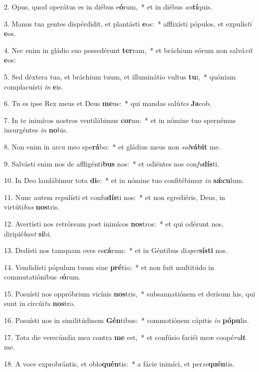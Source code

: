 2. Opus, quod operátus es in diébus e\textbf{ó}rum,~*  et in diébus \textit{an}\textbf{tí}quis.\

3. Manus tua gentes dispérdidit, et plantásti \textbf{e}os:~*  afflixísti pópulos, et expulís\textit{ti} \textbf{e}os.\

4. Nec enim in gládio suo possedérunt \textbf{ter}ram,~*  et bráchium eórum non salvá\textit{vit} \textbf{e}os:\

5. Sed déxtera tua, et bráchium tuum, et illuminátio vultus \textbf{tu}i,~*  quóniam complacuísti \textit{in} \textbf{e}is.\

6. Tu es ipse Rex meus et Deus \textbf{me}us:~*  qui mandas salú\textit{tes} \textbf{Ja}cob.\

7. In te inimícos nostros ventilábimus \textbf{cor}nu:~*  et in nómine tuo spernémus insurgéntes \textit{in} \textbf{no}bis.\

8. Non enim in arcu meo spe\textbf{rá}bo:~*  et gládius meus non \textit{sal}\textbf{vá}\textbf{bit} me.\

9. Salvásti enim nos de affligénti\textbf{bus} nos:~*  et odiéntes nos con\textit{fu}\textbf{dís}ti.\

10. In Deo laudábimur tota \textbf{di}e:~*  et in nómine tuo confitébimur \textit{in} \textbf{sǽ}\textbf{cu}lum.\

11. Nunc autem repulísti et confu\textbf{dís}ti nos:~*  et non egrediéris, Deus, in virtúti\textit{bus} \textbf{nos}tris.\

12. Avertísti nos retrórsum post inimícos \textbf{nos}tros:~*  et qui odérunt nos, diripié\textit{bant} \textbf{si}bi.\

13. Dedísti nos tamquam oves es\textbf{cá}rum:~*  et in Géntibus di\textit{sper}\textbf{sís}\textbf{ti} nos.\

14. Vendidísti pópulum tuum sine \textbf{pré}tio:~*  et non fuit multitúdo in commutatiónibus \textit{e}\textbf{ó}rum.\

15. Posuísti nos oppróbrium vicínis \textbf{nos}tris,~*  subsannatiónem et derísum his, qui sunt in circúi\textit{tu} \textbf{nos}tro.\

16. Posuísti nos in similitúdinem \textbf{Gén}tibus:~*  commotiónem cápitis \textit{in} \textbf{pó}\textbf{pu}lis.\

17. Tota die verecúndia mea contra \textbf{me} est,~*  et confúsio faciéi meæ coopé\textit{ru}\textbf{it} me.\

18. A voce exprobrántis, et oblo\textbf{quén}tis:~*  a fácie inimíci, et per\textit{se}\textbf{quén}tis.\

